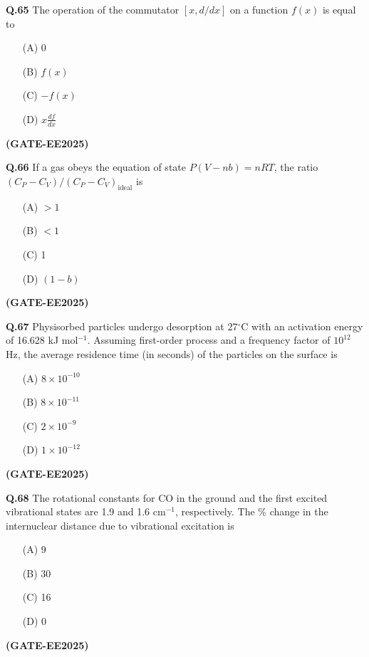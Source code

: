 \documentclass[12pt]{article}
\begin{document}
\begin{enumerate}
\vspace{0.5cm}

\textbf{Q.65} The operation of the commutator $[x, d/dx]$ on a function $f(x)$ is equal to

\begin{enumerate}
\item[(A)] 0
\item[(B)] $f(x)$
\item[(C)] $-f(x)$
\item[(D)] $x \frac{df}{dx}$
\end{enumerate}   \textbf{(GATE-EE2025)}


\vspace{0.5cm}

\textbf{Q.66} If a gas obeys the equation of state $P (V - nb) = nRT$, the ratio $(C_P - C_V)/(C_P - C_V)_{\text{ideal}}$ is

\begin{enumerate}
\item[(A)] $> 1$
\item[(B)] $< 1$
\item[(C)] 1
\item[(D)] $(1 - b)$
\end{enumerate}   \textbf{(GATE-EE2025)}


\vspace{0.5cm}

\textbf{Q.67} Physisorbed particles undergo desorption at 27$^\circ$C with an activation energy of 16.628 kJ mol$^{-1}$. Assuming first-order process and a frequency factor of $10^{12}$ Hz, the average residence time (in seconds) of the particles on the surface is

\begin{enumerate}
\item[(A)] $8 \times 10^{-10}$
\item[(B)] $8 \times 10^{-11}$
\item[(C)] $2 \times 10^{-9}$
\item[(D)] $1 \times 10^{-12}$
\end{enumerate}   \textbf{(GATE-EE2025)}


\vspace{0.5cm}

\textbf{Q.68} The rotational constants for CO in the ground and the first excited vibrational states are 1.9 and 1.6 cm$^{-1}$, respectively. The \% change in the internuclear distance due to vibrational excitation is

\begin{enumerate}
\item[(A)] 9
\item[(B)] 30
\item[(C)] 16
\item[(D)] 0
\end{enumerate}   \textbf{(GATE-EE2025)}



\end{enumerate}
\end{document}
